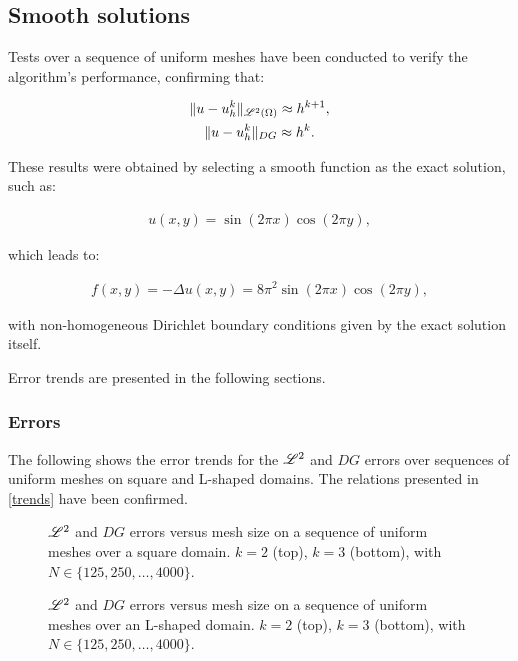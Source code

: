 \subsection{Smooth solutions}

Tests over a sequence of uniform meshes have been conducted to verify the algorithm's performance, confirming that:

\begin{gather} \label{trends}
    \lVert u - u^k_h \rVert_{\mathscr{L}^2(\Omega)} \approx h^{k + 1}, \\
    \lVert u - u^k_h \rVert_{DG} \approx h^k.
\end{gather}

These results were obtained by selecting a smooth function as the exact solution, such as:

\begin{gather}
    u(x, y) = \sin(2 \pi x) \cos(2 \pi y),
\end{gather}

which leads to:

\begin{gather}
    f(x, y) = -\Delta u(x, y) = 8 \pi^2 \sin(2 \pi x) \cos(2 \pi y),
\end{gather}

with non-homogeneous Dirichlet boundary conditions given by the exact solution itself.

Error trends are presented in the following sections.

\newpage
\subsubsection{Errors}

The following shows the error trends for the $\mathscr{L}^2$ and $DG$ errors over sequences of uniform meshes on square and L-shaped domains. The relations presented in \eqref{trends} have been confirmed.

\begin{figure}[!ht]
    
    
    \caption{$\mathscr{L}^2$ and $DG$ errors versus mesh size on a sequence of uniform meshes over a square domain. $k = 2$ (top), $k = 3$ (bottom), with $N \in \{125, 250, \dots, 4000\}$.}
\end{figure}

\newpage
\begin{figure}[!ht]
    
    
    \caption{$\mathscr{L}^2$ and $DG$ errors versus mesh size on a sequence of uniform meshes over an L-shaped domain. $k = 2$ (top), $k = 3$ (bottom), with $N \in \{125, 250, \dots, 4000\}$.}
\end{figure}

